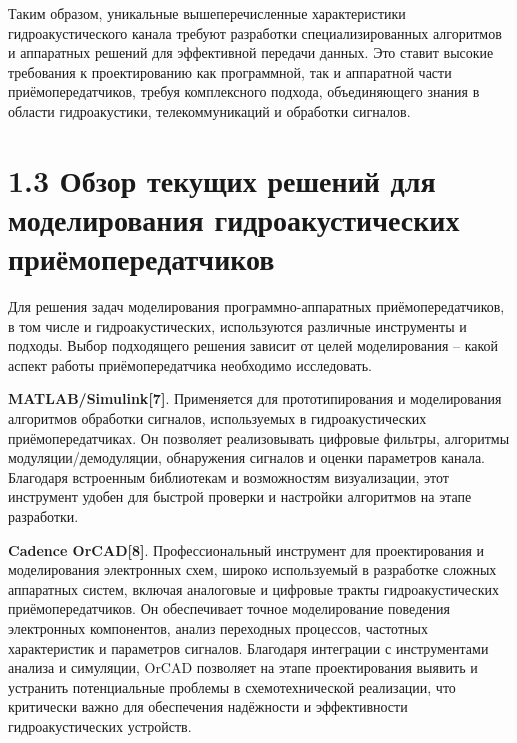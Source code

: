 Таким образом, уникальные вышеперечисленные характеристики
гидроакустического канала требуют разработки специализированных
алгоритмов и аппаратных решений для эффективной передачи данных. Это
ставит высокие требования к проектированию как программной, так и
аппаратной части приёмопередатчиков, требуя комплексного подхода,
объединяющего знания в области гидроакустики, телекоммуникаций и
обработки сигналов.

\section*{1.3 Обзор текущих решений для моделирования гидроакустических
приёмопередатчиков}\label{ux43eux431ux437ux43eux440-ux442ux435ux43aux443ux449ux438ux445-ux440ux435ux448ux435ux43dux438ux439-ux434ux43bux44f-ux43cux43eux434ux435ux43bux438ux440ux43eux432ux430ux43dux438ux44f-ux433ux438ux434ux440ux43eux430ux43aux443ux441ux442ux438ux447ux435ux441ux43aux438ux445-ux43fux440ux438ux451ux43cux43eux43fux435ux440ux435ux434ux430ux442ux447ux438ux43aux43eux432}

Для решения задач моделирования программно-аппаратных
приёмопередатчиков, в том числе и гидроакустических, используются
различные инструменты и подходы. Выбор подходящего решения зависит от
целей моделирования -- какой аспект работы приёмопередатчика необходимо
исследовать.

\textbf{MATLAB/Simulink{[}7{]}}. Применяется для прототипирования и
моделирования алгоритмов обработки сигналов, используемых в
гидроакустических приёмопередатчиках. Он позволяет реализовывать
цифровые фильтры, алгоритмы модуляции/демодуляции, обнаружения сигналов
и оценки параметров канала. Благодаря встроенным библиотекам и
возможностям визуализации, этот инструмент удобен для быстрой проверки и
настройки алгоритмов на этапе разработки.

\textbf{Cadence OrCAD{[}8{]}}. Профессиональный инструмент для
проектирования и моделирования электронных схем, широко используемый в
разработке сложных аппаратных систем, включая аналоговые и цифровые
тракты гидроакустических приёмопередатчиков. Он обеспечивает точное
моделирование поведения электронных компонентов, анализ переходных
процессов, частотных характеристик и параметров сигналов. Благодаря
интеграции с инструментами анализа и симуляции, OrCAD позволяет на этапе
проектирования выявить и устранить потенциальные проблемы в
схемотехнической реализации, что критически важно для обеспечения
надёжности и эффективности гидроакустических устройств.

